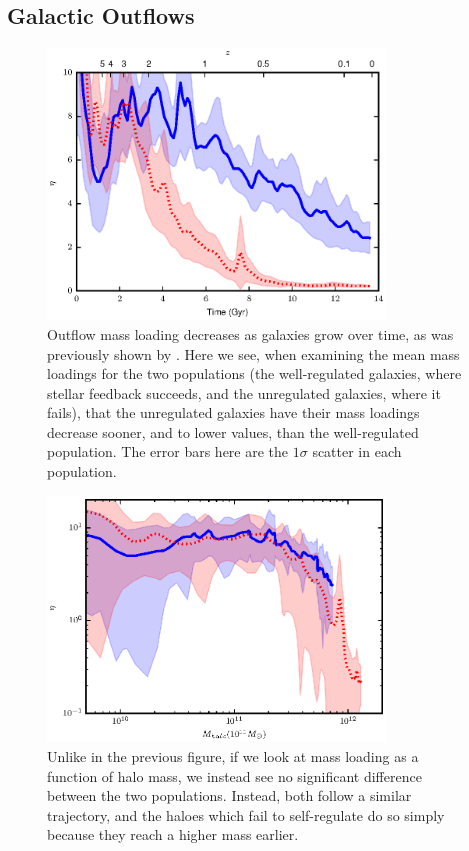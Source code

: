 \subsection{Galactic Outflows}
\begin{figure}
    \includegraphics[width=0.8\textwidth]{figures3/massloading_time.eps}
    \caption[Outflow mass loading evolution in MUGS2]{Outflow mass loading
    decreases as galaxies grow over time, as was previously shown by
    \citet{Keller2015}.  Here we see, when examining the mean mass loadings for
    the two populations (the well-regulated galaxies, where stellar feedback
    succeeds, and the unregulated galaxies, where it fails), that the
    unregulated galaxies have their mass loadings decrease sooner, and to lower
    values, than the well-regulated population.  The error bars here are the
    $1\sigma$ scatter in each population.}
    \label{massloading_time3}
\end{figure}
\begin{figure}
    \includegraphics[width=0.8\textwidth]{figures3/massloading_halo.eps}
    \caption[Mass loading as a function of halo mass in MUGS2]{Unlike in the
    previous figure, if we look at mass loading as a function of halo mass, we
    instead see no significant difference between the two populations.  Instead,
    both follow a similar trajectory, and the haloes which fail to self-regulate
    do so simply because they reach a higher mass earlier.}
    \label{massloading_halo3}
\end{figure}

